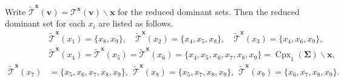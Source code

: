 \documentclass[11pt,reqno]{amsart}
\theoremstyle{plain}
\theoremstyle{definition}
\newtheorem{example}[theorem]{Example}
\numberwithin{equation}{section}
\newcommand\<{\langle}
\renewcommand\>{\rangle}
\newcommand{\on}[1]{\operatorname{#1}}
\def\CCx{\on{Cpx}}   %
\def\vv{\mathbf{v}}
\def\seeds{\mathbf{\Sigma}}
\def\xx{\mathbf{x}}%
\newcommand{\dom}[1]{\mathcal{T}^{#1}}
\newcommand{\rdom}[1]{\widetilde{\mathcal{T}}^{#1}}
\begin{document}
Write $\rdom{\xx}(\vv)=\dom{\xx}(\vv)\backslash\xx$ for the reduced dominant sets.
Then the reduced dominant set for each $x_i$ are listed as follows.
\begin{align*}
     &\rdom{\xx}(x_1)=\{x_8,x_9\},\quad
     \rdom{\xx}(x_2)=\{x_4,x_5,x_8\},\quad
     \rdom{\xx}(x_3)=\{x_4,x_6,x_9\},\\
     &\rdom{\xx}(x_4)=\rdom{\xx}(x_5)=\rdom{\xx}(x_6)=\{x_4,x_5,x_6,x_7,x_8,x_9\}=\CCx_1(\seeds)\backslash\xx,\\
     \rdom{\xx}(x_7)&=\{x_5,x_6,x_7,x_8,x_9\},~~
     \rdom{\xx}(x_8)=\{x_5,x_7,x_8,x_9\},~~
     \rdom{\xx}(x_9)=\{x_6,x_7,x_8,x_9\}.
\end{align*}
\end{document}
